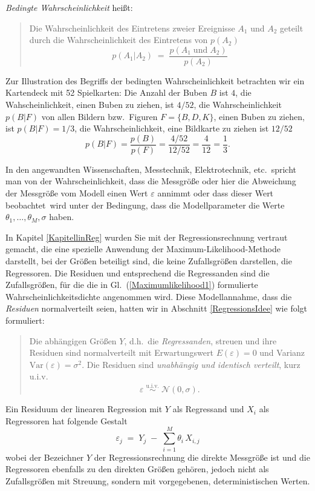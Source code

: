 \textsl{Bedingte Wahrscheinlichkeit} heißt:
\begin{quote}
Die Wahrscheinlichkeit des Eintretens
zweier Ereignisse $A_1$ und $A_2$ geteilt durch die Wahrscheinlichkeit des Eintretens von $p(A_2)$
\begin{equation}
p(A_1 | A_2) \; = \; \frac{p(A_1 \; \mathrm{und} \; A_2)}{p(A_2)}
\end{equation}
\end{quote}
Zur Illustration des Begriffs der bedingten Wahrscheinlichkeit betrachten wir ein
Kartendeck mit 52 Spielkarten: Die Anzahl der Buben $B$ ist $4$, die Wahscheinlichkeit, einen Buben
zu ziehen, ist $4/52$, die
Wahrscheinlichkeit $p(B | F)$ von allen Bildern bzw.\ Figuren $F = \{B, D, K\}$, einen
 Buben zu ziehen, ist $p(B | F) = 1/3$, die Wahrscheinlichkeit, eine Bildkarte zu ziehen ist $12/52$
$$
p(B | F) = \frac{p(B)}{p(F)} = \frac{4/52}{12/52} = \frac{4}{12} = \frac{1}{3} .
$$

In den angewandten Wissenschaften, Messtechnik,
Elektrotechnik, etc.\ spricht man von der Wahrscheinlichkeit, dass die Messgröße
oder hier die Abweichung der Messgröße vom Modell einen Wert $\varepsilon$ annimmt oder
dass dieser Wert \glqq beobachtet\grqq ~wird unter der Bedingung, dass die Modellparameter
die Werte $\theta_1,\dots,\theta_M, \sigma$ haben.


In Kapitel \ref{KapitellinReg} wurden Sie mit der Regressionsrechnung vertraut gemacht, die
eine spezielle Anwendung der Maximum-Likelihood-Methode darstellt, bei der
Größen beteiligt sind, die keine Zufallsgrößen darstellen, die Regressoren.
Die Residuen und entsprechend die Regressanden sind die Zufallsgrößen,
für die die in Gl.~(\ref{Maximumlikelihood1}) formulierte Wahrscheinlichkeitsdichte
angenommen wird.
Diese Modellannahme, dass die \textsl{Residuen} normalverteilt seien,
hatten wir in Abschnitt \ref{RegressionsIdee} wie folgt formuliert:
\begin{quote}
Die abhängigen Größen $Y$, d.h.\ die \textsl{Regressanden}, streuen und ihre Residuen sind
	normalverteilt mit Erwartungswert $E(\varepsilon) = 0$ und Varianz $\mathrm{Var}(\varepsilon) = \sigma^2$.
	Die Residuen sind \textsl{unabhängig und identisch verteilt}, kurz u.i.v.
	\begin{equation}
	\varepsilon \; \overset{\mathrm{u.i.v.}}{\sim} \; \mathcal{N}(0,\sigma) .
	\end{equation}
\end{quote}
Ein Residuum der linearen Regression mit $Y$ als Regressand und $X_i$ als Regressoren
hat folgende Gestalt
\begin{equation}
\varepsilon_j \; = \; Y_j \; - \; \sum\limits_{i=1}^{M} \theta_i \, X_{i,j}
\end{equation}
wobei der Bezeichner $Y$ der Regressionsrechnung die direkte Messgröße ist und die
Regressoren ebenfalls zu den direkten Größen gehören, jedoch nicht als Zufallsgrößen mit
Streuung, sondern mit vorgegebenen, deterministischen Werten.

